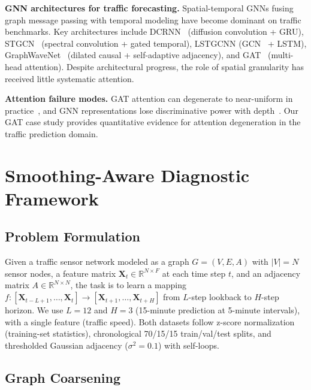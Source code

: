 \documentclass[sigconf]{acmart}
\begin{document}
\textbf{GNN architectures for traffic forecasting.} Spatial-temporal GNNs fusing graph message passing with temporal modeling have become dominant on traffic benchmarks. Key architectures include DCRNN~\cite{li2018diffusion} (diffusion convolution + GRU), STGCN~\cite{yu2018spatio} (spectral convolution + gated temporal), LSTGCNN (GCN~\cite{kipf2017semi} + LSTM), GraphWaveNet~\cite{wu2019graph} (dilated causal + self-adaptive adjacency), and GAT~\cite{velickovic2018graph} (multi-head attention). Despite architectural progress, the role of spatial granularity has received little systematic attention.

\textbf{Attention failure modes.} GAT attention can degenerate to near-uniform in practice~\cite{brody2021attentive}, and GNN representations lose discriminative power with depth~\cite{oono2020graph,topping2022oversquashing}. Our GAT case study provides quantitative evidence for attention degeneration in the traffic prediction domain.

\section{Smoothing-Aware Diagnostic Framework}

\subsection{Problem Formulation}

Given a traffic sensor network modeled as a graph $G = (V, E, A)$ with $|V| = N$ sensor nodes, a feature matrix $\mathbf{X}_t \in \mathbb{R}^{N \times F}$ at each time step $t$, and an adjacency matrix $A \in \mathbb{R}^{N \times N}$, the task is to learn a mapping $f: [\mathbf{X}_{t-L+1}, \ldots, \mathbf{X}_t] \rightarrow [\mathbf{X}_{t+1}, \ldots, \mathbf{X}_{t+H}]$ from $L$-step lookback to $H$-step horizon. We use $L = 12$ and $H = 3$ (15-minute prediction at 5-minute intervals), with a single feature (traffic speed). Both datasets follow z-score normalization (training-set statistics), chronological 70/15/15 train/val/test splits, and thresholded Gaussian adjacency ($\sigma^2 = 0.1$) with self-loops.

\subsection{Graph Coarsening}
\end{document}
